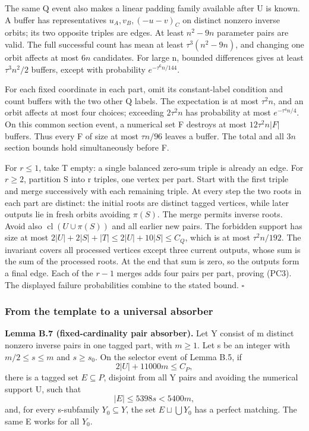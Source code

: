 \documentclass[11pt,a4paper]{article}
\newcommand{\statementstart}{\par\addvspace{6pt plus 1pt minus 1pt}\noindent}
\begin{document}
The same Q event also makes a linear padding family available after U is known. A buffer has representatives \(u_A,v_B,(-u-v)_C\) on distinct nonzero inverse orbits; its two opposite triples are edges. At least \(n^2-9n\) parameter pairs are valid. The full successful count has mean at least \(\tau^3(n^2-9n)\), and changing one orbit affects at most \(6n\) candidates. For large n, bounded differences gives at least \(\tau^3n^2/2\) buffers, except with probability \(e^{-\tau^6n/144}\).

For each fixed coordinate in each part, omit its constant-label condition and count buffers with the two other Q labels. The expectation is at most \(\tau^2n\), and an orbit affects at most four choices; exceeding \(2\tau^2n\) has probability at most \(e^{-\tau^4n/4}\). On this common section event, a numerical set F destroys at most \(12\tau^2n|F|\) buffers. Thus every F of size at most \(\tau n/96\) leaves a buffer. The total and all \(3n\) section bounds hold simultaneously before F.

For \(r\le1\), take T empty: a single balanced zero-sum triple is already an edge. For \(r\ge2\), partition S into r triples, one vertex per part. Start with the first triple and merge successively with each remaining triple. At every step the two roots in each part are distinct: the initial roots are distinct tagged vertices, while later outputs lie in fresh orbits avoiding \(\pi(S)\). The merge permits inverse roots. Avoid also \(\operatorname{cl}(U\cup\pi(S))\) and all earlier new pairs. The forbidden support has size at most \(2|U|+2|S|+|T|\le2|U|+10|S|\le C_Q\), which is at most \(\tau^2n/192\). The invariant covers all processed vertices except three current outputs, whose sum is the sum of the processed roots. At the end that sum is zero, so the outputs form a final edge. Each of the \(r-1\) merges adds four pairs per part, proving (PC3). The displayed failure probabilities combine to the stated bound. \(\square\)

\hypertarget{from-the-template-to-a-universal-absorber}{%
\subsubsection{From the template to a universal absorber}\label{from-the-template-to-a-universal-absorber}}

\statementstart\textbf{Lemma B.7 (fixed-cardinality pair absorber).} Let Y consist of m distinct nonzero inverse pairs in one tagged part, with \(m\ge 1\). Let s be an integer with \(m/2\le s\le m\) and \(s\ge s_0\). On the selector event of Lemma B.5, if \begin{equation}
2|U|+11000m\le C_P,
\tag{AC12}\label{eq:AC12}
\end{equation} there is a tagged set \(E\subseteq P\), disjoint from all Y pairs and avoiding the numerical support U, such that \begin{equation}
|E|\le5398s<5400m,
\tag{AC12a}\label{eq:AC12a}
\end{equation} and, for every s-subfamily \(Y_0\subseteq Y\), the set \(E\sqcup \bigcup Y_0\) has a perfect matching. The same E works for all \(Y_0\).
\end{document}
